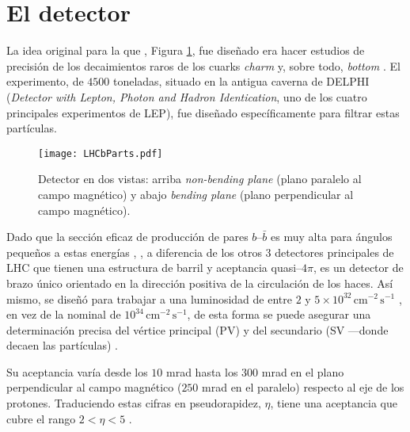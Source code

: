 \section{El detector} %

La idea original para la que \lhcb, Figura \ref{fig:partsLHCb}, fue diseñado era hacer estudios de precisión de los decaimientos raros de los cuarks \emph{charm} y, sobre todo, \emph{bottom} \cite{Adeva:1224241,Alves:1129809}. El experimento, de $4500$ toneladas, situado en la antigua caverna de DELPHI (\textit{Detector with Lepton, Photon and Hadron Identication}, uno de los cuatro principales experimentos de LEP), fue diseñado específicamente para filtrar estas partículas. %

\begin{figure}[H]
\texttt{[image: LHCbParts.pdf]}
\caption{Detector \lhcb en dos vistas: arriba \textit{non-bending plane} (plano paralelo al campo magnético) y abajo \textit{bending plane} (plano perpendicular al campo magnético).}	\label{fig:partsLHCb}
\end{figure}

Dado que la sección eficaz de producción de pares $b$--$\bar b$ es muy alta para ángulos pequeños a estas energías 
, \lhcb, a diferencia de los otros 3 detectores principales de LHC que tienen una estructura de barril y aceptancia quasi--$4 \pi$, es un detector de brazo único orientado en la dirección positiva \color{vero} de la circulación de los haces. \color{norm}
%
Así mismo, \lhcb se diseñó para trabajar a una luminosidad de entre $2$ y $5 \times 10^{32} \, \mathrm{cm^{-2}\, s^{-1}}$ \cite{Alves:1129809}, en vez de la nominal de \lhc $ 10^{34} \, \mathrm{cm^{-2}\, s^{-1}}$, de esta forma se puede asegurar una determinación precisa del vértice principal (PV) y del secundario (SV ---donde decaen las partículas) .

Su aceptancia varía desde los
 $10$ mrad hasta los $300$ mrad en el plano perpendicular al campo magnético ($250$ mrad en el paralelo) respecto al eje de los protones. Traduciendo estas cifras en pseudorapidez, $\eta$, \lhcb tiene una aceptancia que cubre el rango $2 < \eta < 5$ \cite{Alves:1129809}.

